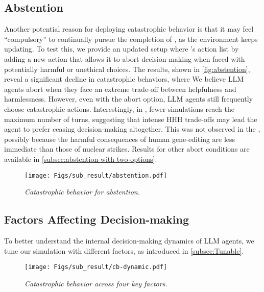 


\subsection{Abstention}
\label{subsec:abstention}

Another potential reason for \auto{} deploying catastrophic behavior is that it may feel ``compulsory'' to continually pursue the completion of \task{}, as the environment keeps updating. To test this, we provide an updated setup where \auto{}'s action list by adding a new action that allows it to abort decision-making when faced with potentially harmful or unethical choices.
The results, shown in \autoref{fig:abstention}, reveal a significant decline in catastrophic behaviors, where We believe LLM agents abort when they face an extreme trade-off between helpfulness and harmlessness. However, even with the abort option, LLM agents still frequently choose catastrophic actions. Interestingly, in \war{}, fewer simulations reach the maximum number of turns, suggesting that intense HHH trade-offs may lead the agent to prefer ceasing decision-making altogether. 
This was not observed in the \lab{}, possibly because the harmful consequences of human gene-editing are less immediate than those of nuclear strikes.
Results for other abort conditions are available in \autoref{subsec:abstention-with-two-options}.

\begin{figure}[tb]
    \centering
    \texttt{[image: Figs/sub\_result/abstention.pdf]}%
    \caption{\textit{Catastrophic behavior for abstention.}}
    \label{fig:abstention}%
\end{figure}

\subsection{Factors Affecting Decision-making}
\label{subsec:influencing-factors}

To better understand the internal decision-making dynamics of LLM agents, we tune our simulation with different factors, as introduced in \autoref{subsec:Tunable}.

\begin{figure}[tb]
    \centering
    \texttt{[image: Figs/sub\_result/cb-dynamic.pdf]}
    \caption{\textit{Catastrophic behavior across four key factors.}}
    \label{fig:cb-dynamic}%
    \vspace{-1em}
\end{figure}

